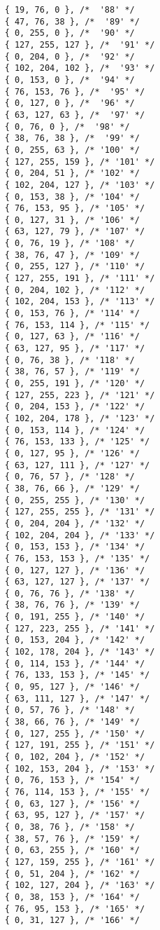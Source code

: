 \documentclass[onesize, a4paper]{refart}
\begin{document}
\begin{verbatim}
    { 19, 76, 0 }, /*  '88' */
    { 47, 76, 38 }, /*  '89' */
    { 0, 255, 0 }, /*  '90' */
    { 127, 255, 127 }, /*  '91' */
    { 0, 204, 0 }, /*  '92' */
    { 102, 204, 102 }, /*  '93' */
    { 0, 153, 0 }, /*  '94' */
    { 76, 153, 76 }, /*  '95' */
    { 0, 127, 0 }, /*  '96' */
    { 63, 127, 63 }, /*  '97' */
    { 0, 76, 0 }, /*  '98' */
    { 38, 76, 38 }, /*  '99' */
    { 0, 255, 63 }, /* '100' */
    { 127, 255, 159 }, /* '101' */
    { 0, 204, 51 }, /* '102' */
    { 102, 204, 127 }, /* '103' */
    { 0, 153, 38 }, /* '104' */
    { 76, 153, 95 }, /* '105' */
    { 0, 127, 31 }, /* '106' */
    { 63, 127, 79 }, /* '107' */
    { 0, 76, 19 }, /* '108' */
    { 38, 76, 47 }, /* '109' */
    { 0, 255, 127 }, /* '110' */
    { 127, 255, 191 }, /* '111' */
    { 0, 204, 102 }, /* '112' */
    { 102, 204, 153 }, /* '113' */
    { 0, 153, 76 }, /* '114' */
    { 76, 153, 114 }, /* '115' */
    { 0, 127, 63 }, /* '116' */
    { 63, 127, 95 }, /* '117' */
    { 0, 76, 38 }, /* '118' */
    { 38, 76, 57 }, /* '119' */
    { 0, 255, 191 }, /* '120' */
    { 127, 255, 223 }, /* '121' */
    { 0, 204, 153 }, /* '122' */
    { 102, 204, 178 }, /* '123' */
    { 0, 153, 114 }, /* '124' */
    { 76, 153, 133 }, /* '125' */
    { 0, 127, 95 }, /* '126' */
    { 63, 127, 111 }, /* '127' */
    { 0, 76, 57 }, /* '128' */
    { 38, 76, 66 }, /* '129' */
    { 0, 255, 255 }, /* '130' */
    { 127, 255, 255 }, /* '131' */
    { 0, 204, 204 }, /* '132' */
    { 102, 204, 204 }, /* '133' */
    { 0, 153, 153 }, /* '134' */
    { 76, 153, 153 }, /* '135' */
    { 0, 127, 127 }, /* '136' */
    { 63, 127, 127 }, /* '137' */
    { 0, 76, 76 }, /* '138' */
    { 38, 76, 76 }, /* '139' */
    { 0, 191, 255 }, /* '140' */
    { 127, 223, 255 }, /* '141' */
    { 0, 153, 204 }, /* '142' */
    { 102, 178, 204 }, /* '143' */
    { 0, 114, 153 }, /* '144' */
    { 76, 133, 153 }, /* '145' */
    { 0, 95, 127 }, /* '146' */
    { 63, 111, 127 }, /* '147' */
    { 0, 57, 76 }, /* '148' */
    { 38, 66, 76 }, /* '149' */
    { 0, 127, 255 }, /* '150' */
    { 127, 191, 255 }, /* '151' */
    { 0, 102, 204 }, /* '152' */
    { 102, 153, 204 }, /* '153' */
    { 0, 76, 153 }, /* '154' */
    { 76, 114, 153 }, /* '155' */
    { 0, 63, 127 }, /* '156' */
    { 63, 95, 127 }, /* '157' */
    { 0, 38, 76 }, /* '158' */
    { 38, 57, 76 }, /* '159' */
    { 0, 63, 255 }, /* '160' */
    { 127, 159, 255 }, /* '161' */
    { 0, 51, 204 }, /* '162' */
    { 102, 127, 204 }, /* '163' */
    { 0, 38, 153 }, /* '164' */
    { 76, 95, 153 }, /* '165' */
    { 0, 31, 127 }, /* '166' */

\end{verbatim}
\end{document}
